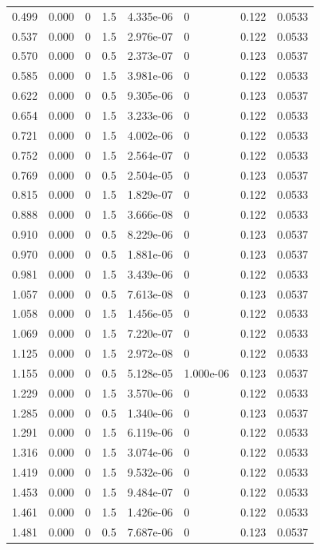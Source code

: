 \documentclass[preview]{standalone}
\begin{document}
{{\begin{tabular}{L{1.2cm}C{1.2cm} C{0.3cm}C{0.5cm} C{1.4cm}C{1.4cm} C{1.4cm}C{1.4cm}}
  0.499  &  0.000  & 0     & 1.5 &  4.335e-06  & 0  & 0.122 &  0.0533   \\ 
  0.537  &  0.000  & 0     & 1.5 &  2.976e-07  & 0  & 0.122 &  0.0533   \\ 
  0.570  &  0.000  & 0     & 0.5 &  2.373e-07  & 0  & 0.123 &  0.0537   \\ 
  0.585  &  0.000  & 0     & 1.5 &  3.981e-06  & 0  & 0.122 &  0.0533   \\ 
  0.622  &  0.000  & 0     & 0.5 &  9.305e-06  & 0  & 0.123 &  0.0537   \\ 
  0.654  &  0.000  & 0     & 1.5 &  3.233e-06  & 0  & 0.122 &  0.0533   \\ 
  0.721  &  0.000  & 0     & 1.5 &  4.002e-06  & 0  & 0.122 &  0.0533   \\ 
  0.752  &  0.000  & 0     & 1.5 &  2.564e-07  & 0  & 0.122 &  0.0533   \\ 
  0.769  &  0.000  & 0     & 0.5 &  2.504e-05  & 0  & 0.123 &  0.0537   \\ 
  0.815  &  0.000  & 0     & 1.5 &  1.829e-07  & 0  & 0.122 &  0.0533   \\ 
  0.888  &  0.000  & 0     & 1.5 &  3.666e-08  & 0  & 0.122 &  0.0533   \\ 
  0.910  &  0.000  & 0     & 0.5 &  8.229e-06  & 0  & 0.123 &  0.0537   \\ 
  0.970  &  0.000  & 0     & 0.5 &  1.881e-06  & 0  & 0.123 &  0.0537   \\ 
  0.981  &  0.000  & 0     & 1.5 &  3.439e-06  & 0  & 0.122 &  0.0533   \\ 
  1.057  &  0.000  & 0     & 0.5 &  7.613e-08  & 0  & 0.123 &  0.0537   \\ 
  1.058  &  0.000  & 0     & 1.5 &  1.456e-05  & 0  & 0.122 &  0.0533   \\ 
  1.069  &  0.000  & 0     & 1.5 &  7.220e-07  & 0  & 0.122 &  0.0533   \\ 
  1.125  &  0.000  & 0     & 1.5 &  2.972e-08  & 0  & 0.122 &  0.0533   \\ 
  1.155  &  0.000  & 0     & 0.5 &  5.128e-05  & 1.000e-06  & 0.123 &  0.0537   \\ 
  1.229  &  0.000  & 0     & 1.5 &  3.570e-06  & 0  & 0.122 &  0.0533   \\ 
  1.285  &  0.000  & 0     & 0.5 &  1.340e-06  & 0  & 0.123 &  0.0537   \\ 
  1.291  &  0.000  & 0     & 1.5 &  6.119e-06  & 0  & 0.122 &  0.0533   \\ 
  1.316  &  0.000  & 0     & 1.5 &  3.074e-06  & 0  & 0.122 &  0.0533   \\ 
  1.419  &  0.000  & 0     & 1.5 &  9.532e-06  & 0  & 0.122 &  0.0533   \\ 
  1.453  &  0.000  & 0     & 1.5 &  9.484e-07  & 0  & 0.122 &  0.0533   \\ 
  1.461  &  0.000  & 0     & 1.5 &  1.426e-06  & 0  & 0.122 &  0.0533   \\ 
  1.481  &  0.000  & 0     & 0.5 &  7.687e-06  & 0  & 0.123 &  0.0537   \\ 
\hline 
\end{tabular} 

}}
\end{document}
